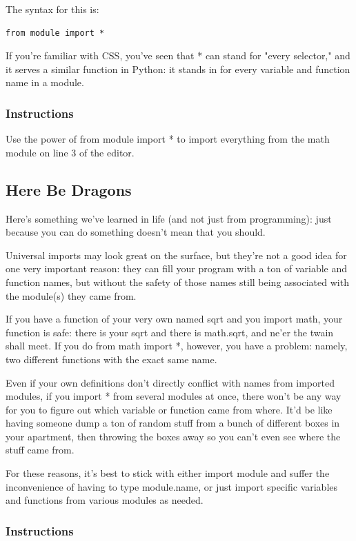 \documentclass[12pt,a4paper,final,twoside,onecolumn,titlepage]{book}
\begin{document}
The syntax for this is:
\begin{lstlisting}
from module import *
\end{lstlisting}
If you're familiar with CSS, you've seen that * can stand for "every selector," and it serves a similar function in Python: it stands in for every variable and function name in a module.
\subsubsection{Instructions}

Use the power of from module import * to import everything from the math module on line 3 of the editor.

\subsection{Here Be Dragons}

Here's something we've learned in life (and not just from programming): just because you can do something doesn't mean that you should.

Universal imports may look great on the surface, but they're not a good idea for one very important reason: they can fill your program with a ton of variable and function names, but without the safety of those names still being associated with the module(s) they came from.

If you have a function of your very own named sqrt and you import math, your function is safe: there is your sqrt and there is math.sqrt, and ne'er the twain shall meet. If you do from math import *, however, you have a problem: namely, two different functions with the exact same name.

Even if your own definitions don't directly conflict with names from imported modules, if you import * from several modules at once, there won't be any way for you to figure out which variable or function came from where. It'd be like having someone dump a ton of random stuff from a bunch of different boxes in your apartment, then throwing the boxes away so you can't even see where the stuff came from.

For these reasons, it's best to stick with either import module and suffer the inconvenience of having to type module.name, or just import specific variables and functions from various modules as needed.

\subsubsection{Instructions}
\end{document}
